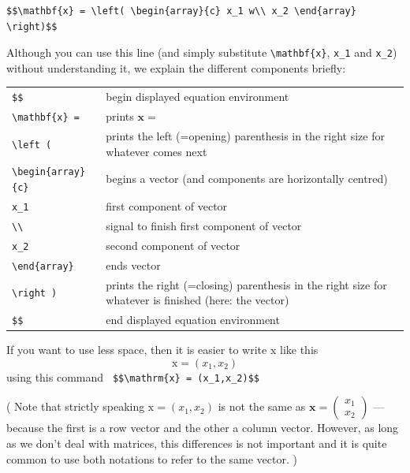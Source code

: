 \documentclass[12pt,a4paper]{article}
\begin{document}
{\small
\begin{verbatim}
$$\mathbf{x} = \left( \begin{array}{c} x_1 w\\ x_2 \end{array} \right)$$
\end{verbatim}
}\bigskip

Although you can use this line (and simply substitute
\verb:\mathbf{x}:, \verb:x_1: and \verb:x_2:) without understanding
it, we explain the different components briefly:

\begin{tabular}{l|p{10cm}}\hline
  \verb:$$: & begin displayed equation environment\\
  \verb:\mathbf{x} =: & prints $\mathbf{x} =$\\
  \verb:\left (: & prints the left (=opening) parenthesis in the 
    right size for whatever comes next\\ 
    \verb:\begin{array}{c}: & begins a vector (and components are 
      horizontally centred)\\ 
      \verb:x_1: & first component of vector\\
      \verb:\\: & signal to finish first component of vector\\
      \verb:x_2: & second component of vector\\
      \verb:\end{array}: & ends vector\\
    \verb:\right ): & prints the right (=closing) parenthesis in 
  the right size for whatever is finished (here: the vector)\\
  \verb:$$: & end displayed equation environment\\\hline
\end{tabular}\bigskip

If you want to use less space, then it is easier to write $\mathrm{x}$
like this $$\mathrm{x} = (x_1,x_2)$$ using this command
\verb: $$\mathrm{x} = (x_1,x_2)$$:

{\footnotesize( Note that strictly speaking $\mathrm{x} = (x_1,x_2)$
  is not the same as $ \mathbf{x} = \left( \begin{array}{c} x_1 \\
      x_2 \end{array} \right) $ --- because the first is a row vector
  and the other a column vector. However, as long as we don't deal
  with matrices, this differences is not important and it is quite
  common to use both notations to refer to the same vector. )}
\end{document}
